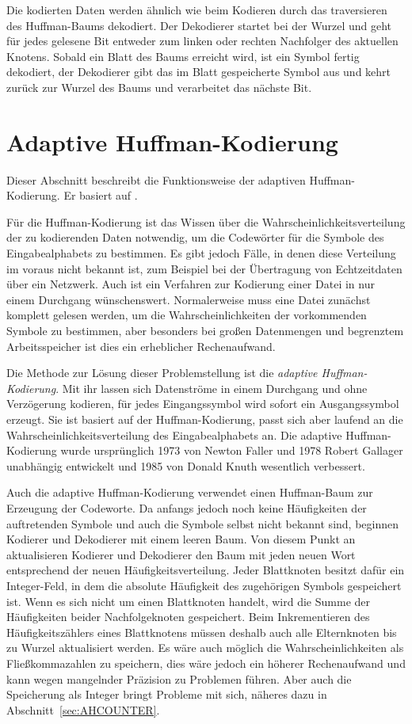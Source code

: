 \documentclass[twoside,11pt,a4paper]{article}
\theoremstyle{break}
\begin{document}
Die kodierten Daten werden ähnlich wie beim Kodieren durch das
traversieren des Huffman-Baums dekodiert. Der Dekodierer startet bei
der Wurzel und geht für jedes gelesene Bit entweder zum linken oder
rechten Nachfolger des aktuellen Knotens. Sobald ein Blatt des Baums
erreicht wird, ist ein Symbol fertig dekodiert, der Dekodierer gibt
das im Blatt gespeicherte Symbol aus und kehrt zurück zur Wurzel des
Baums und verarbeitet das nächste Bit.

\section{Adaptive Huffman-Kodierung}
Dieser Abschnitt beschreibt die Funktionsweise der adaptiven Huffman-Kodierung. Er basiert auf \cite[S. 234 --
 S. 238]{Salomon:2010}.

Für die Huffman-Kodierung ist das Wissen über die
Wahrscheinlichkeitsverteilung der zu kodierenden Daten notwendig, um
die Codewörter für die Symbole des Eingabealphabets zu bestimmen. Es
gibt jedoch Fälle, in denen diese Verteilung im voraus nicht bekannt
ist, zum Beispiel bei der Übertragung von Echtzeitdaten über ein
Netzwerk. Auch ist ein Verfahren zur Kodierung einer Datei in nur einem
Durchgang wünschenswert. Normalerweise muss eine Datei zunächst
komplett gelesen werden, um die Wahrscheinlichkeiten der vorkommenden
Symbole zu bestimmen, aber besonders bei großen Datenmengen und
begrenztem Arbeitsspeicher ist dies ein erheblicher Rechenaufwand.

Die Methode zur Lösung dieser Problemstellung ist die \emph{adaptive
  Huffman-Kodierung}. Mit ihr lassen sich Datenströme in einem
Durchgang und ohne Verzögerung kodieren, für jedes Eingangssymbol wird
sofort ein Ausgangssymbol erzeugt. Sie ist basiert auf der
Huffman-Kodierung, passt sich aber laufend an die
Wahrscheinlichkeitsverteilung des Eingabealphabets an. Die adaptive
Huffman-Kodierung wurde ursprünglich 1973 von Newton Faller und 1978
Robert Gallager unabhängig entwickelt und 1985 von Donald Knuth
wesentlich verbessert.

Auch die adaptive Huffman-Kodierung verwendet einen Huffman-Baum zur
Erzeugung der Codeworte. Da anfangs jedoch noch keine Häufigkeiten der
auftretenden Symbole und auch die Symbole selbst nicht bekannt sind,
beginnen Kodierer und Dekodierer mit einem leeren Baum. Von diesem
Punkt an aktualisieren Kodierer und Dekodierer den Baum mit jeden
neuen Wort entsprechend der neuen Häufigkeitsverteilung. Jeder
Blattknoten besitzt dafür ein Integer-Feld, in dem die absolute
Häufigkeit des zugehörigen Symbols gespeichert ist. Wenn es sich nicht
um einen Blattknoten handelt, wird die Summe der Häufigkeiten beider
Nachfolgeknoten gespeichert. Beim Inkrementieren des
Häufigkeitszählers eines Blattknotens müssen deshalb auch alle
Elternknoten bis zu Wurzel aktualisiert werden. Es wäre auch
möglich die Wahrscheinlichkeiten als Fließkommazahlen zu speichern,
dies wäre jedoch ein höherer Rechenaufwand und kann wegen mangelnder
Präzision zu Problemen führen. Aber auch die Speicherung als Integer bringt
Probleme mit sich, näheres dazu in Abschnitt~\ref{sec:AHCOUNTER}.
\end{document}
